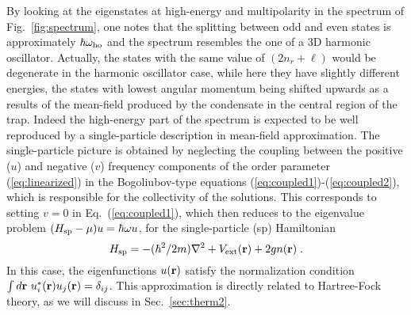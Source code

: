 By looking at the eigenstates at high-energy and multipolarity in the 
spectrum of Fig.~\ref{fig:spectrum},  one notes that the splitting 
between odd and even states is approximately $\hbar \omega_{\rm ho}$ 
and the spectrum resembles the one of a 3D harmonic oscillator. Actually, 
the states with the same value of $(2 n_r +\ell)$ would be degenerate 
in the harmonic oscillator case, while here they have slightly different
energies,  the  states with lowest angular momentum being shifted upwards 
as a results of the mean-field produced by the condensate in the central 
region of the trap. Indeed the high-energy part of the spectrum is expected 
to be well reproduced by a single-particle description in mean-field 
approximation. The single-particle picture is obtained by neglecting
the coupling between the positive ($u$) and negative ($v$) frequency
components of the order parameter (\ref{eq:linearized}) in the 
Bogoliubov-type equations (\ref{eq:coupled1})-(\ref{eq:coupled2}),
which is responsible for the collectivity of the solutions. This
corresponds to setting $v=0$ in Eq.~(\ref{eq:coupled1}), which then
reduces to the eigenvalue problem $(H_{\rm sp}-\mu)u=\hbar\omega u$,  
for the single-particle (sp) Hamiltonian
\begin{equation}
H_{\rm sp} = - (\hbar^2/2m) \nabla^2 +  V_{\rm ext}({\bf r}) +
2 g n({\bf r}) \; .
\label{eq:HFhamiltonian}
\end{equation}
In this case, the eigenfunctions $u({\bf r})$
satisfy the normalization condition $\int  d{\bf r} \ u_i^\ast({\bf r})
u_j({\bf r})=\delta_{ij}$.  This approximation is directly related to
Hartree-Fock theory, as we will discuss  in Sec.~\ref{sec:therm2}.

